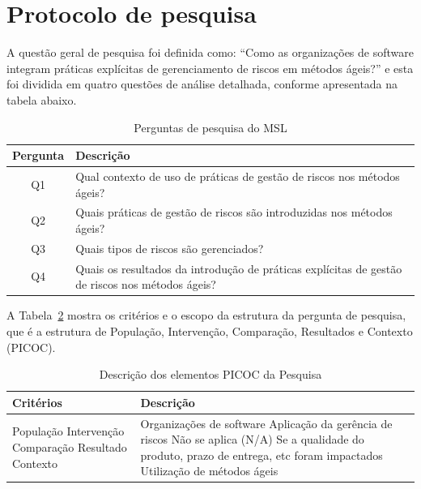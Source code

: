 \documentclass[
	12pt,
	openright,
	twoside,
	a4paper,
	english,
	brazil
	]{abntex2}
\begin{document}
\section{Protocolo de pesquisa}

A questão geral de pesquisa foi definida como: “Como as organizações de software integram práticas explícitas de gerenciamento de riscos em métodos ágeis?” e esta foi dividida em quatro questões de análise detalhada, conforme apresentada na tabela abaixo.

\begin{table}[h!]
  \caption{Perguntas de pesquisa do MSL}
  \centering
  \begin{tabular}{|c|p{10cm}|}
  \hline
  \textbf{Pergunta} & \textbf{Descrição} \\ \hline
  Q1 & Qual contexto de uso de práticas de gestão de riscos nos métodos ágeis? \\ \hline
  Q2 & Quais práticas de gestão de riscos são introduzidas nos métodos ágeis? \\ \hline
  Q3 & Quais tipos de riscos são gerenciados? \\ \hline
  Q4 & Quais os resultados da introdução de práticas explícitas de gestão de riscos nos métodos ágeis? \\ \hline
  \end{tabular}
  \label{tab:perguntas-msl}
\end{table}

A Tabela~\ref{tab:picoc} \cite{kitchenham2007guidelines} mostra os critérios e o escopo da estrutura da pergunta de pesquisa, que é a estrutura de População, Intervenção, Comparação, Resultados e Contexto (PICOC).

\begin{table}[H]
  \centering
  \caption{Descrição dos elementos PICOC da Pesquisa}
  \begin{tabular}{|p{3cm}|p{12cm}|}
  \hline
  \textbf{Critérios} & \textbf{Descrição} \\ \hline
  População \newline Intervenção \newline Comparação \newline Resultado \newline Contexto 
  & Organizações de software \newline Aplicação da gerência de riscos \newline Não se aplica (N/A) \newline Se a qualidade do produto, prazo de entrega, etc foram impactados \newline Utilização de métodos ágeis \\ \hline
  \end{tabular}
  \label{tab:picoc}
\end{table}
\end{document}
